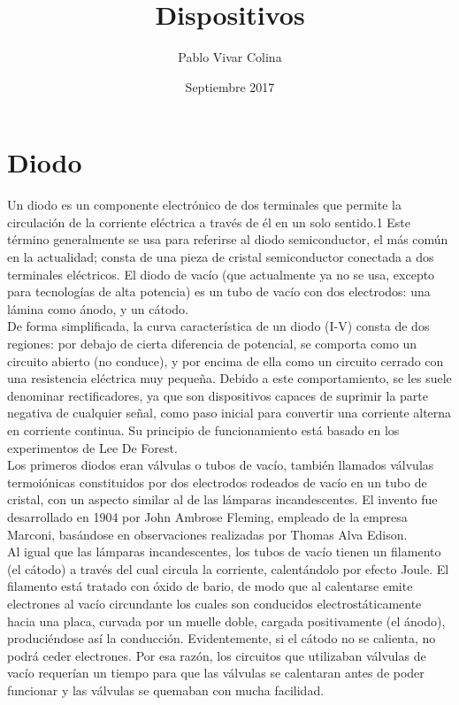 \documentclass{article}
\title{Dispositivos}
\author{Pablo Vivar Colina}
\date{Septiembre 2017}
\begin{document}
\maketitle

\section{Diodo}

Un diodo es un componente electrónico de dos terminales que permite la circulación de la corriente eléctrica a través de él en un solo sentido.1​ Este término generalmente se usa para referirse al diodo semiconductor, el más común en la actualidad; consta de una pieza de cristal semiconductor conectada a dos terminales eléctricos. El diodo de vacío (que actualmente ya no se usa, excepto para tecnologías de alta potencia) es un tubo de vacío con dos electrodos: una lámina como ánodo, y un cátodo.\citep{diodoWiki}\\

De forma simplificada, la curva característica de un diodo (I-V) consta de dos regiones: por debajo de cierta diferencia de potencial, se comporta como un circuito abierto (no conduce), y por encima de ella como un circuito cerrado con una resistencia eléctrica muy pequeña. Debido a este comportamiento, se les suele denominar rectificadores, ya que son dispositivos capaces de suprimir la parte negativa de cualquier señal, como paso inicial para convertir una corriente alterna en corriente continua. Su principio de funcionamiento está basado en los experimentos de Lee De Forest.\citep{diodoWiki}\\


Los primeros diodos eran válvulas o tubos de vacío, también llamados válvulas termoiónicas constituidos por dos electrodos rodeados de vacío en un tubo de cristal, con un aspecto similar al de las lámparas incandescentes. El invento fue desarrollado en 1904 por John Ambrose Fleming, empleado de la empresa Marconi, basándose en observaciones realizadas por Thomas Alva Edison.\citep{diodoWiki}\\


Al igual que las lámparas incandescentes, los tubos de vacío tienen un filamento (el cátodo) a través del cual circula la corriente, calentándolo por efecto Joule. El filamento está tratado con óxido de bario, de modo que al calentarse emite electrones al vacío circundante los cuales son conducidos electrostáticamente hacia una placa, curvada por un muelle doble, cargada positivamente (el ánodo), produciéndose así la conducción. Evidentemente, si el cátodo no se calienta, no podrá ceder electrones. Por esa razón, los circuitos que utilizaban válvulas de vacío requerían un tiempo para que las válvulas se calentaran antes de poder funcionar y las válvulas se quemaban con mucha facilidad.\citep{diodoWiki}\\
\end{document}
